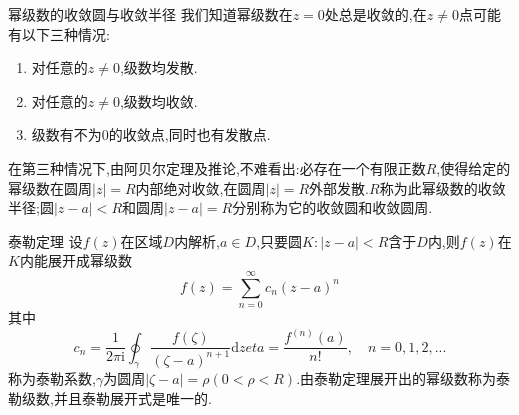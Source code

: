 \documentclass[zihao=-4,a4paper]{ctexart}
\begin{document}
\begin{mdefinition}{幂级数的收敛圆与收敛半径}
	我们知道幂级数在${z} = 0$处总是收敛的,在${z} {\neq} 0$点可能有以下三种情况:
	\begin{enumerate}
		\item 对任意的${z} {\neq} 0$,级数均发散.
		\item 对任意的${z} {\neq} 0$,级数均收敛.
		\item 级数有不为$0$的收敛点,同时也有发散点.
	\end{enumerate}

	在第三种情况下,由阿贝尔定理及推论,不难看出:必存在一个有限正数$R$,使得给定的幂级数在圆周$\left| {z} \right| = {R}$内部绝对收敛,在圆周$\left| {z} \right| = {R}$外部发散.$R$称为此幂级数的收敛半径;圆$\left| {z} - {a} \right| < {R}$和圆周$\left| {z} - {a} \right| = {R}$分别称为它的收敛圆和收敛圆周.
\end{mdefinition}

\begin{mtheorem}{泰勒定理}
	设${f} \left( {z} \right)$在区域$D$内解析,${a} {\in} {D}$,只要圆$K:\left| {z} - {a} \right| < {R}$含于$D$内,则${f} \left( {z} \right)$在$K$内能展开成幂级数
	\begin{equation}
		{f} \left( {z} \right) = \sum^{\infty}_{n=0} {c}_{n} {\left( {z} - {a} \right)}^{n}
	\end{equation}
	其中
	\begin{equation}
		{c}_{n} = \frac{1}{2 {\pi} \text{i}} \oint_{\gamma} \frac{{f} \left( {\zeta} \right)}{{\left( {\zeta} - {a} \right)}^{n+1}} \text{d}{zeta} = \frac{{f}^{\left( {n} \right)} \left( {a} \right)}{n!} , {\quad} n = 0 , 1 , 2 , ...
	\end{equation}
	称为泰勒系数,${\gamma}$为圆周$\left| {\zeta} - {a} \right| = {\rho} \left( {0} < {\rho} < {R} \right)$.由泰勒定理展开出的幂级数称为泰勒级数,并且泰勒展开式是唯一的.
\end{mtheorem}
\end{document}

